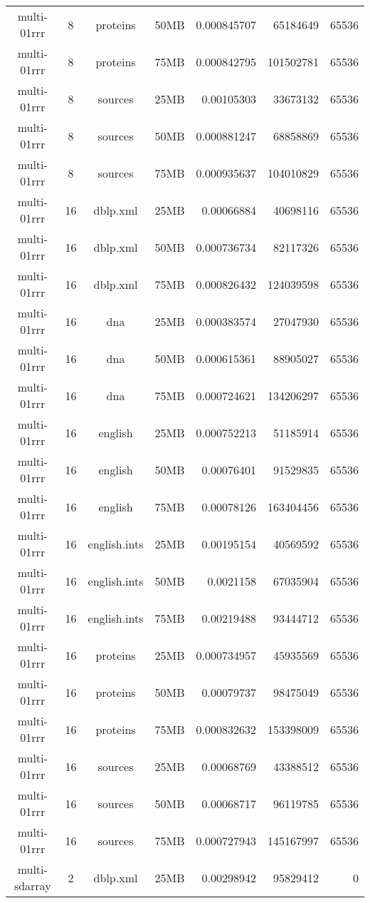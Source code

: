 \begin{table}[h]
\begin{center}
\begin{tabular}{ccccrrr}
multi-01rrr & 8 & proteins & 50MB & 0.000845707 & 65184649 & 65536 \\
multi-01rrr & 8 & proteins & 75MB & 0.000842795 & 101502781 & 65536 \\
multi-01rrr & 8 & sources & 25MB & 0.00105303 & 33673132 & 65536 \\
multi-01rrr & 8 & sources & 50MB & 0.000881247 & 68858869 & 65536 \\
multi-01rrr & 8 & sources & 75MB & 0.000935637 & 104010829 & 65536 \\
multi-01rrr & 16 & dblp.xml & 25MB & 0.00066884 & 40698116 & 65536 \\
multi-01rrr & 16 & dblp.xml & 50MB & 0.000736734 & 82117326 & 65536 \\
multi-01rrr & 16 & dblp.xml & 75MB & 0.000826432 & 124039598 & 65536 \\
multi-01rrr & 16 & dna & 25MB & 0.000383574 & 27047930 & 65536 \\
multi-01rrr & 16 & dna & 50MB & 0.000615361 & 88905027 & 65536 \\
multi-01rrr & 16 & dna & 75MB & 0.000724621 & 134206297 & 65536 \\
multi-01rrr & 16 & english & 25MB & 0.000752213 & 51185914 & 65536 \\
multi-01rrr & 16 & english & 50MB & 0.00076401 & 91529835 & 65536 \\
multi-01rrr & 16 & english & 75MB & 0.00078126 & 163404456 & 65536 \\
multi-01rrr & 16 & english.ints & 25MB & 0.00195154 & 40569592 & 65536 \\
multi-01rrr & 16 & english.ints & 50MB & 0.0021158 & 67035904 & 65536 \\
multi-01rrr & 16 & english.ints & 75MB & 0.00219488 & 93444712 & 65536 \\
multi-01rrr & 16 & proteins & 25MB & 0.000734957 & 45935569 & 65536 \\
multi-01rrr & 16 & proteins & 50MB & 0.00079737 & 98475049 & 65536 \\
multi-01rrr & 16 & proteins & 75MB & 0.000832632 & 153398009 & 65536 \\
multi-01rrr & 16 & sources & 25MB & 0.00068769 & 43388512 & 65536 \\
multi-01rrr & 16 & sources & 50MB & 0.00068717 & 96119785 & 65536 \\
multi-01rrr & 16 & sources & 75MB & 0.000727943 & 145167997 & 65536 \\
multi-sdarray & 2 & dblp.xml & 25MB & 0.00298942 & 95829412 & 0 \\

\end{tabular}
\end{center}
\end{table}
